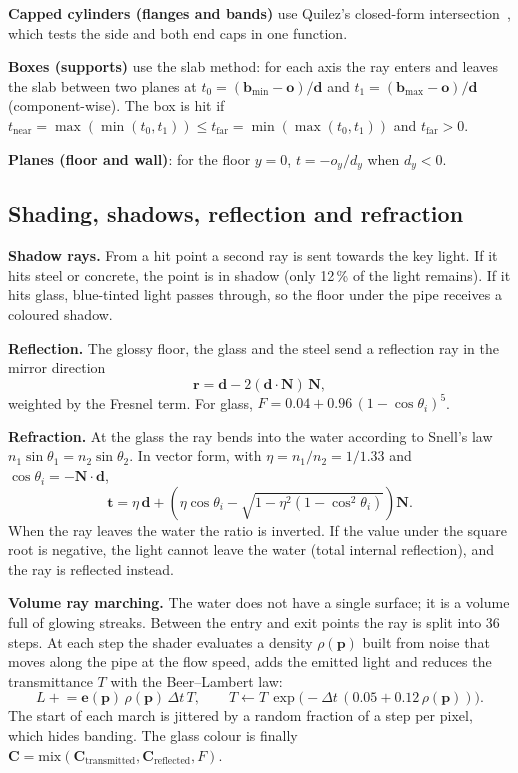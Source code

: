 \documentclass[11pt,a4paper]{report}
\newcommand{\vect}[1]{\mathbf{#1}}
\begin{document}
\textbf{Capped cylinders (flanges and bands)} use Quilez's closed-form
intersection~\cite{iq}, which tests the side and both end caps in one function.

\textbf{Boxes (supports)} use the slab method: for each axis the ray enters and leaves
the slab between two planes at
$t_0 = (\vect{b}_{\min}-\vect{o})/\vect{d}$ and $t_1 = (\vect{b}_{\max}-\vect{o})/\vect{d}$
(component-wise). The box is hit if
$t_{\text{near}} = \max(\min(t_0,t_1)) \le t_{\text{far}} = \min(\max(t_0,t_1))$ and
$t_{\text{far}} > 0$.

\textbf{Planes (floor and wall)}: for the floor $y=0$, $t = -o_y/d_y$ when $d_y<0$.

\subsection{Shading, shadows, reflection and refraction}

\textbf{Shadow rays.} From a hit point a second ray is sent towards the key light.
If it hits steel or concrete, the point is in shadow (only 12\,\% of the light
remains). If it hits glass, blue-tinted light passes through, so the floor under the
pipe receives a coloured shadow.

\textbf{Reflection.} The glossy floor, the glass and the steel send a reflection ray
in the mirror direction
\begin{equation}
\vect{r} = \vect{d} - 2(\vect{d}\cdot\vect{N})\,\vect{N},
\end{equation}
weighted by the Fresnel term. For glass, $F = 0.04 + 0.96\,(1-\cos\theta_i)^5$.

\textbf{Refraction.} At the glass the ray bends into the water according to Snell's
law $n_1\sin\theta_1 = n_2\sin\theta_2$. In vector form, with
$\eta = n_1/n_2 = 1/1.33$ and $\cos\theta_i = -\vect{N}\cdot\vect{d}$,
\begin{equation}
\vect{t} = \eta\,\vect{d} + \left(\eta\cos\theta_i - \sqrt{1-\eta^2(1-\cos^2\theta_i)}\right)\vect{N}.
\end{equation}
When the ray leaves the water the ratio is inverted. If the value under the square
root is negative, the light cannot leave the water (total internal reflection), and
the ray is reflected instead.

\textbf{Volume ray marching.} The water does not have a single surface; it is a volume
full of glowing streaks. Between the entry and exit points the ray is split into 36
steps. At each step the shader evaluates a density $\rho(\vect{p})$ built from noise
that moves along the pipe at the flow speed, adds the emitted light and reduces the
transmittance $T$ with the Beer--Lambert law:
\begin{equation}
L \mathrel{+}= \vect{e}(\vect{p})\,\rho(\vect{p})\,\Delta t\,T,\qquad
T \leftarrow T\,\exp\!\big(-\Delta t\,(0.05 + 0.12\,\rho(\vect{p}))\big).
\end{equation}
The start of each march is jittered by a random fraction of a step per pixel, which
hides banding. The glass colour is finally
$\vect{C} = \text{mix}(\vect{C}_{\text{transmitted}}, \vect{C}_{\text{reflected}}, F)$.
\end{document}
